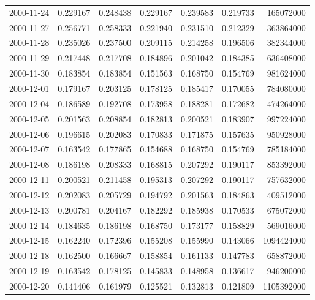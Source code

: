 \begin{tabular}{lrrrrrr}
2000-11-24 &    0.229167 &    0.248438 &    0.229167 &    0.239583 &    0.219733 &   165072000 \\
2000-11-27 &    0.256771 &    0.258333 &    0.221940 &    0.231510 &    0.212329 &   363864000 \\
2000-11-28 &    0.235026 &    0.237500 &    0.209115 &    0.214258 &    0.196506 &   382344000 \\
2000-11-29 &    0.217448 &    0.217708 &    0.184896 &    0.201042 &    0.184385 &   636408000 \\
2000-11-30 &    0.183854 &    0.183854 &    0.151563 &    0.168750 &    0.154769 &   981624000 \\
2000-12-01 &    0.179167 &    0.203125 &    0.178125 &    0.185417 &    0.170055 &   784080000 \\
2000-12-04 &    0.186589 &    0.192708 &    0.173958 &    0.188281 &    0.172682 &   474264000 \\
2000-12-05 &    0.201563 &    0.208854 &    0.182813 &    0.200521 &    0.183907 &   997224000 \\
2000-12-06 &    0.196615 &    0.202083 &    0.170833 &    0.171875 &    0.157635 &   950928000 \\
2000-12-07 &    0.163542 &    0.177865 &    0.154688 &    0.168750 &    0.154769 &   785184000 \\
2000-12-08 &    0.186198 &    0.208333 &    0.168815 &    0.207292 &    0.190117 &   853392000 \\
2000-12-11 &    0.200521 &    0.211458 &    0.195313 &    0.207292 &    0.190117 &   757632000 \\
2000-12-12 &    0.202083 &    0.205729 &    0.194792 &    0.201563 &    0.184863 &   409512000 \\
2000-12-13 &    0.200781 &    0.204167 &    0.182292 &    0.185938 &    0.170533 &   675072000 \\
2000-12-14 &    0.184635 &    0.186198 &    0.168750 &    0.173177 &    0.158829 &   569016000 \\
2000-12-15 &    0.162240 &    0.172396 &    0.155208 &    0.155990 &    0.143066 &  1094424000 \\
2000-12-18 &    0.162500 &    0.166667 &    0.158854 &    0.161133 &    0.147783 &   658872000 \\
2000-12-19 &    0.163542 &    0.178125 &    0.145833 &    0.148958 &    0.136617 &   946200000 \\
2000-12-20 &    0.141406 &    0.161979 &    0.125521 &    0.132813 &    0.121809 &  1105392000 \\

\end{tabular}
